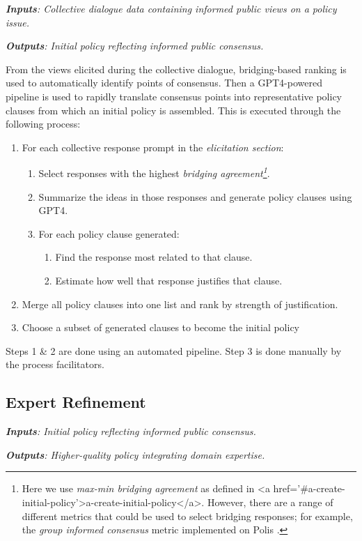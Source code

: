 \documentclass{article}
\begin{document}
\begin{tcolorbox}[colback=blue!5!white,colframe=blue!30!white]
\emph{\textbf{Inputs}: Collective dialogue data containing informed public views on a policy issue.}

\emph{\textbf{Outputs}: Initial policy reflecting informed public consensus.}
\end{tcolorbox}


From the views elicited during the collective dialogue, bridging-based ranking \cite{ovadya2022bridging,recommendation2022bridging} is used to automatically identify points of consensus. Then a GPT4-powered pipeline is used to rapidly translate consensus points into representative policy clauses from which an initial policy is assembled. This is executed through the following process:


\begin{enumerate}
\item For each collective response prompt in the \emph{elicitation section}:
\begin{enumerate}
\item Select responses with the highest \emph{bridging agreement\footnote{Here we use \emph{max-min bridging agreement} as defined in <a href='#a-create-initial-policy'>a-create-initial-policy</a>. However, there are a range of different metrics that could be used to select bridging responses; for example, the \emph{group informed consensus} metric implemented on Polis \cite{small2021polis}.}}.
\item Summarize the ideas in those responses and generate policy clauses using GPT4.
\item For each policy clause generated:
\begin{enumerate}
\item Find the response most related to that clause.
\item Estimate how well that response justifies that clause.
\end{enumerate}
\end{enumerate}
\item Merge all policy clauses into one list and rank by strength of justification.
\item Choose a subset of generated clauses to become the initial policy
\end{enumerate}

Steps 1 \& 2 are done using an automated pipeline. Step 3 is done manually by the process facilitators.

\subsection{Expert Refinement}
\begin{tcolorbox}[colback=blue!5!white,colframe=blue!30!white]
\emph{\textbf{Inputs}: Initial policy reflecting informed public consensus.}

\emph{\textbf{Outputs}: Higher-quality policy integrating domain expertise.}
\end{tcolorbox}
\end{document}
